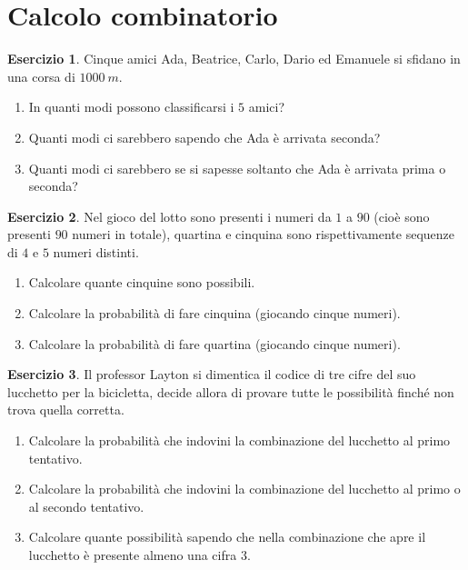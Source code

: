 \documentclass[12pt,a4paper]{article}
\theoremstyle{definition}
\newtheorem{exe}{Esercizio}
\begin{document}
\section{Calcolo combinatorio}

\begin{exe}
	Cinque amici Ada, Beatrice, Carlo, Dario ed Emanuele si sfidano in una corsa di $ 1000 \ m$.
	\begin{enumerate}
		\item In quanti modi possono classificarsi i $ 5 $ amici?
		\item Quanti modi ci sarebbero sapendo che Ada è arrivata seconda?
		\item Quanti modi ci sarebbero se si sapesse soltanto che Ada è arrivata prima o seconda?
	\end{enumerate}
\end{exe}

\begin{exe}
	Nel gioco del lotto sono presenti i numeri da $ 1 $ a $ 90 $ (cioè sono presenti $ 90 $ numeri in totale), quartina e cinquina sono rispettivamente sequenze di  $ 4 $ e $ 5 $ numeri distinti.
	\begin{enumerate}
		\item Calcolare quante cinquine sono possibili.
		\item Calcolare la probabilità di fare cinquina (giocando cinque numeri).
		\item Calcolare la probabilità di fare quartina (giocando cinque numeri).
	\end{enumerate}
\end{exe}

\begin{exe}
	Il professor Layton si dimentica il codice di tre cifre del suo lucchetto per la bicicletta, decide allora di provare tutte le possibilità finché non trova quella corretta.
	\begin{enumerate}
		\item Calcolare la probabilità che indovini la combinazione del lucchetto al primo tentativo.
		\item Calcolare la probabilità che indovini la combinazione del lucchetto al primo o al secondo tentativo.
		\item Calcolare quante possibilità sapendo che nella combinazione che apre il lucchetto è presente almeno una cifra $ 3 $.
	\end{enumerate}
\end{exe}
\end{document}
